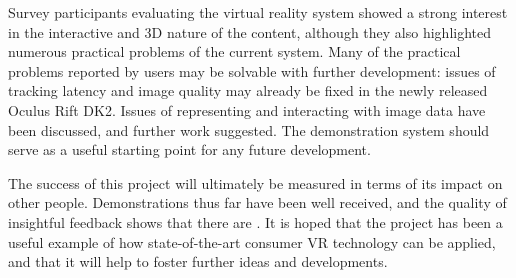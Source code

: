 \documentclass[MSc,paper=a4,pagesize=auto]{icldt}
\begin{document}
Survey participants evaluating the virtual reality system showed a strong interest in the interactive and 3D nature of the content, although they also highlighted numerous practical problems of the current system. Many of the practical problems reported by users may be solvable with further development: issues of tracking latency and image quality may already be fixed in the newly released Oculus Rift DK2. Issues of representing and interacting with image data have been discussed, and further work suggested. The demonstration system should serve as a useful starting point for any future development.

The success of this project will ultimately be measured in terms of its impact on other people. Demonstrations thus far have been well received, and the quality of insightful feedback shows that there are . It is hoped that the project has been a useful example of how state-of-the-art consumer VR technology can be applied, and that it will help to foster further ideas and developments. 
 

	
\end{document}
